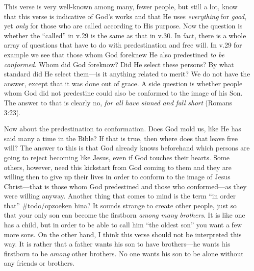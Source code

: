 This verse is very well-known among many, fewer people, but still a lot,
know that this verse is indicative of God's works and that He uses
\emph{everything} for \emph{good}, yet \emph{only} for those who are
called according to His purpose. Now the question is whether the
``called'' in v.29 is the same as that in v.30. In fact, there is a
whole array of questions that have to do with predestination and free
will. In v.29 for example we see that those whom God foreknew He also
predestined \emph{to be conformed}. Whom did God foreknow? Did He select
these persons? By what standard did He select them---is it anything
related to merit? We do not have the answer, except that it was done out
of grace. A side question is whether people whom God did not predestine
could also be conformed to the image of his Son. The answer to that is
clearly no, \emph{for all have sinned and fall short} (Romans 3:23).

Now about the predestination to conformation. Does God mold us, like He
has said many a time in the Bible? If that is true, then where does that
leave free will? The answer to this is that God already knows beforehand
which persons are going to reject becoming like Jesus, even if God
touches their hearts. Some others, however, need this kickstart from God
coming to them and they are willing then to give up their lives in order
to conform to the image of Jesus Christ---that is those whom God
predestined and those who conformed---as they were willing anyway.
Another thing that comes to mind is the term ``in order that''
\#todo/opzoeken hina? It sounds strange to create other people, just so
that your only son can become the firstborn \emph{among many brothers}.
It is like one has a child, but in order to be able to call him ``the
oldest son'' you want a few more sons. On the other hand, I think this
verse should not be interpreted this way. It is rather that a father
wants his son to have brothers---he wants his firstborn to be
\emph{among} other brothers. No one wants his son to be alone without
any friends or brothers.


